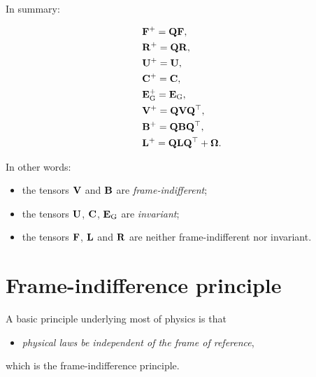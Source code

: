 In summary:
\begin{definition}
\begin{equation}
	\begin{aligned}
		&\mathbf{F}^+=\mathbf{Q}\mathbf{F},\\
		&\mathbf{R}^+=\mathbf{Q}\mathbf{R},\\
		&\mathbf{U}^+=\mathbf{U},\\
		&\mathbf{C}^+=\mathbf{C},\\
		&\mathbf{E}_{\rm G}^+=\mathbf{E}_{\rm G},\\
		&\mathbf{V}^+=\mathbf{Q}\mathbf{V}\mathbf{Q}^\top,\\
		&\mathbf{B}^+=\mathbf{Q}\mathbf{B}\mathbf{Q}^\top,\\
		& \mathbf{L}^+=\mathbf{Q}\mathbf{L}\mathbf{Q}^\top+\bm{\Omega}.
	\end{aligned}
\end{equation}
\end{definition}
In other words:
\begin{itemize}
	\item the tensors $\mathbf{V}$ and $\mathbf{B}$ are \textit{frame-indifferent};
	\item the tensors $\mathbf{U}$, $\mathbf{C}$, $\mathbf{E}_{\rm G}$ are \textit{invariant};
	\item the tensors $\mathbf{F}$, $\mathbf{L}$ and $\mathbf{R}$ are neither frame-indifferent nor invariant.
\end{itemize}


\section{Frame-indifference principle}
A basic principle underlying most of physics is that
\begin{itemize}
	\item \emph{physical laws be independent of the frame of reference},
\end{itemize}
which is the frame-indifference principle.

